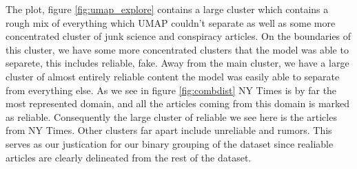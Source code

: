 The plot, figure \ref{fig:umap_explore} contains a large cluster which contains a rough mix of everything which UMAP
couldn't separate as well as some more concentrated cluster of junk science and conspiracy articles. On the boundaries
of this cluster, we have some more concentrated clusters that the model was able to separete, this includes reliable,
fake. Away from the main cluster, we have a large cluster of almost entirely reliable content the model was easily able
to separate from everything else. As we see in figure \ref{fig:combdist} NY Times is by far the most represented domain, and all the
articles coming from this domain is marked as reliable. Consequently the large cluster of reliable we see here is the
articles from NY Times. Other clusters far apart include unreliable and rumors. This serves as our justication for our binary grouping of the dataset since realiable articles are clearly delineated from the rest of the dataset. 



